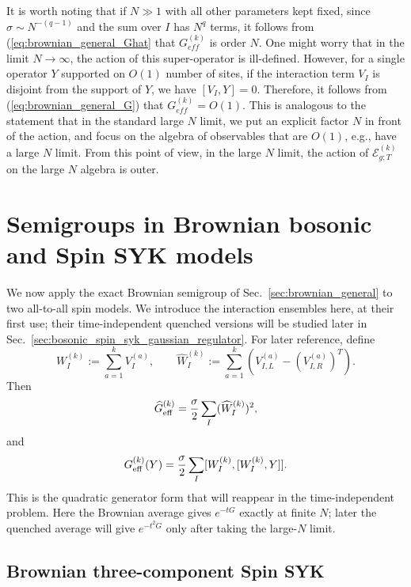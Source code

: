 \documentclass{article}
\theoremstyle{definition}
\begin{document}
It is worth noting that if $N\gg 1$ with all other parameters kept fixed, since $\sigma\sim N^{-(q-1)}$ and the sum over $I$ has $N^q$ terms, it follows from (\ref{eq:brownian_general_Ghat} that $G_{eff}^{(k)}$ is order $N$. One might worry that in the limit $N\to \infty$, the action of this super-operator is ill-defined. However, for a single operator $Y$ supported on $O(1)$ number of sites, if the interaction term $V_I$ is disjoint from the support of $Y$, we have $[V_I,Y]=0$. Therefore, it follows from (\ref{eq:brownian_general_G}) that $G_{eff}^{(k)}=O(1)$. This is analogous to the statement that in the standard large $N$ limit, we put an explicit factor $N$ in front of the action, and focus on the algebra of observables that are $O(1)$, e.g., have a large $N$ limit. From this point of view, in the large $N$ limit, the action of $\mathcal{E}_{g;T}^{(k)}$ on the large $N$ algebra is outer.

\section{Semigroups in Brownian bosonic and Spin SYK models}
\label{sec:brownian_spin_syk}

We now apply the exact Brownian semigroup of
Sec.~\ref{sec:brownian_general} to two all-to-all spin models.  We introduce
the interaction ensembles here, at their first use; their time-independent
quenched versions will be studied later in
Sec.~\ref{sec:bosonic_spin_syk_gaussian_regulator}.  For later reference,
define
\begin{equation}
    W_I^{(k)}:=\sum_{a=1}^kV_I^{(a)},
    \qquad
    \widehat W_I^{(k)}
    :=\sum_{a=1}^k
      \left(V_{I,L}^{(a)}-(V_{I,R}^{(a)})^T\right).
\end{equation}
Then
\begin{equation}
    \widehat G_{\rm eff}^{(k)}
    =\frac{\sigma}{2}\sum_I(\widehat W_I^{(k)})^2,
\end{equation}
and
\begin{equation}
    G_{\rm eff}^{(k)}(Y)
    =\frac{\sigma}{2}\sum_I
      [W_I^{(k)},[W_I^{(k)},Y]].
\end{equation}
This is the quadratic generator form that will reappear in the time-independent
problem.  Here the Brownian average gives $e^{-t G}$ exactly at finite $N$;
later the quenched average will give $e^{-t^2G}$ only after taking the
large-$N$ limit.

\subsection{Brownian three-component Spin SYK}
\end{document}
